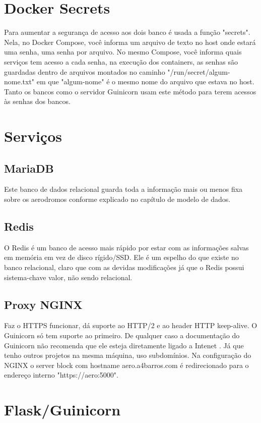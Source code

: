 \section{Docker Secrets}

Para aumentar a segurança de acesso aos dois banco é usada a função "secrets". Nela, no Docker Compose,
você informa um arquivo de texto no host onde estará uma senha, uma senha por arquivo. No mesmo Compose,
você informa quais serviços tem acesso a cada senha, na execução dos containers, as senhas são
guardadas dentro de arquivos montados no caminho "/run/secret/algum-nome.txt" em que "algum-nome" é
o mesmo nome do arquivo que estava no host.
Tanto os bancos como o servidor Guinicorn usam este método para terem acessos às senhas dos bancos.

\section{Serviços}

\subsection{MariaDB}
Este banco de dados relacional guarda toda a informação mais ou menos fixa sobre os aerodromos
conforme explicado no capítulo de modelo de dados.

\subsection{Redis}
O Redis é um banco de acesso mais rápido por estar com as informações salvas em memória em vez
de disco rígido/SSD. Ele é um espelho do que existe no banco relacional, claro que com as devidas
modificações já que o Redis possui sistema-chave valor, não sendo relacional.

\subsection{Proxy NGINX}
Faz o HTTPS funcionar, dá suporte ao HTTP/2 e ao header HTTP keep-alive. O Guinicorn só tem suporte
ao primeiro. De qualquer caso a documentação do Guinicorn não recomenda que ele esteja diretamente
ligado a Intenet \cite{nginx-gunicorn}. Já que tenho outros projetos na mesma máquina, uso subdomínios.
Na configuração do NGINX o server block com hostname aero.a4barros.com é redirecionado para 
o endereço interno "https://aero:5000".

\section{Flask/Guinicorn}

